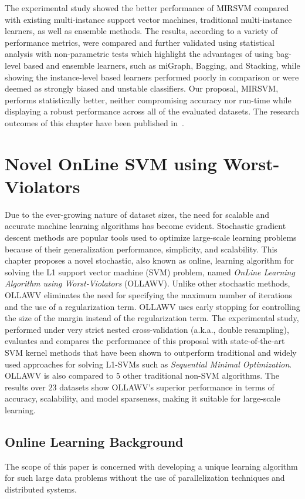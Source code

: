 \documentclass[reqno]{vcuthesis}
\numberwithin{equation}{chapter}
\begin{document}
The experimental study showed the better performance of MIRSVM compared with existing multi-instance support vector machines, traditional multi-instance learners, as well as ensemble methods. The results, according to a variety of performance metrics, were compared and further validated using statistical analysis with non-parametric tests which highlight the advantages of using bag-level based and ensemble learners, such as miGraph, Bagging, and Stacking, while showing the instance-level based learners performed poorly in comparison or were deemed as strongly biased and unstable classifiers. Our proposal, MIRSVM, performs statistically better, neither compromising accuracy nor run-time while displaying a robust performance across all of the evaluated datasets. The research outcomes of this chapter have been published in~\cite{melki2018mirsvm}.

\chapter{Novel OnLine SVM using Worst-Violators}
Due to the ever-growing nature of dataset sizes, the need for scalable and accurate machine learning algorithms has become evident. Stochastic gradient descent methods are popular tools used to optimize large-scale learning problems because of their generalization performance, simplicity, and scalability. This chapter proposes a novel stochastic, also known as online, learning algorithm for solving the L1 support vector machine (SVM) problem, named \textit{OnLine Learning Algorithm using Worst-Violators} (OLLAWV). Unlike other stochastic methods, OLLAWV eliminates the need for specifying the maximum number of iterations and the use of a regularization term. OLLAWV uses early stopping for controlling the size of the margin instead of the regularization term. The experimental study, performed under very strict nested cross-validation (a.k.a., double resampling), evaluates and compares the performance of this proposal with state-of-the-art SVM kernel methods that have been shown to outperform traditional and widely used approaches for solving L1-SVMs such as \textit{Sequential Minimal Optimization}. OLLAWV is also compared to $5$ other traditional non-SVM algorithms. The results over $23$ datasets show OLLAWV's superior performance in terms of accuracy, scalability, and model sparseness, making it suitable for large-scale learning.

\section{Online Learning Background}
The scope of this paper is concerned with developing a unique learning algorithm for such large data problems without the use of parallelization techniques and distributed systems. 
\end{document}
